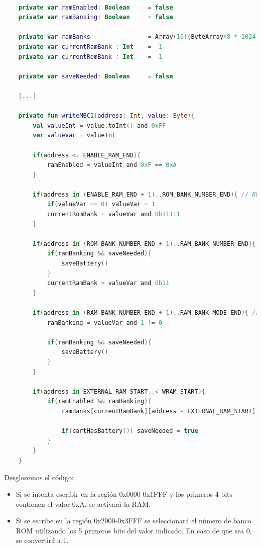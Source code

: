 \begin{lstlisting}[language=Kotlin, caption={Escritura en regiones ROM.}, label={code:romwritekotlin}]

    private var ramEnabled: Boolean     = false
    private var ramBanking: Boolean     = false

    private var ramBanks                = Array(16){ByteArray(8 * 1024)} // MBC1 = 4 Banks Max. -- MBC3 / MBC5 = 16 Banks Max.
    private var currentRamBank : Int    = -1
    private var currentRomBank : Int    = -1

    private var saveNeeded: Boolean     = false

    [...]

    private fun writeMBC1(address: Int, value: Byte){
        val valueInt = value.toInt() and 0xFF
        var valueVar = valueInt

        if(address <= ENABLE_RAM_END){
            ramEnabled = valueInt and 0xF == 0xA
        }

        if(address in (ENABLE_RAM_END + 1)..ROM_BANK_NUMBER_END){ // ROM BANK SELECTION
            if(valueVar == 0) valueVar = 1
            currentRomBank = valueVar and 0b11111
        }

        if(address in (ROM_BANK_NUMBER_END + 1)..RAM_BANK_NUMBER_END){ // RAM BANK SELECTION
            if(ramBanking && saveNeeded){
                saveBattery()
            }
            currentRamBank = valueVar and 0b11
        }

        if(address in (RAM_BANK_NUMBER_END + 1)..RAM_BANK_MODE_END){ //
            ramBanking = valueVar and 1 != 0

            if(ramBanking && saveNeeded){
                saveBattery()
            }
        }

        if(address in EXTERNAL_RAM_START..< WRAM_START){
            if(ramEnabled && ramBanking){
                ramBanks[currentRamBank][address - EXTERNAL_RAM_START] = value

                if(cartHasBattery()) saveNeeded = true
            }
        }
    }
\end{lstlisting}

Desglosemos el código:

\begin{itemize}
    \item Si se intenta escribir en la región 0x0000-0x1FFF y los primeros 4 bits contienen el valor 0xA, se activará la RAM.
    \item Si se escribe en la región 0x2000-0x3FFF se seleccionará el número de banco ROM utilizando los 5 primeros bits del valor indicado. En caso de que sea 0, se convertirá a 1.
\end{itemize}

\cleardoublepage